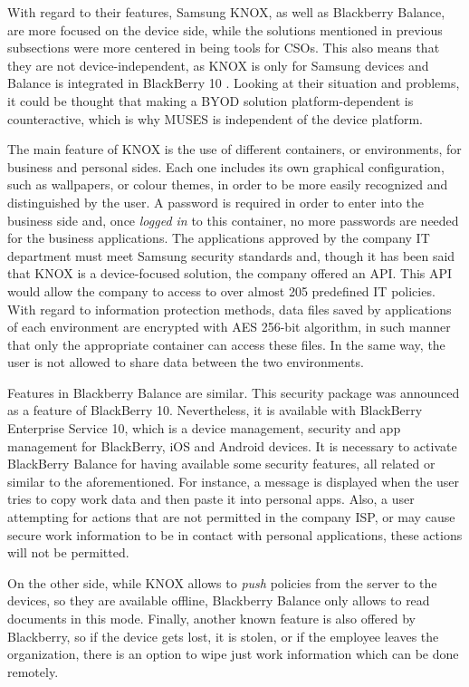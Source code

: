 With regard to their features, Samsung KNOX, as well as Blackberry Balance, are more focused on the device side, while the solutions mentioned in previous subsections were more centered in being tools for CSOs. This also means that they are not device-independent, as KNOX is only for Samsung devices and Balance is integrated in BlackBerry 10 \cite{Blackberry_tool}. Looking at their situation and problems, it could be thought that making a BYOD solution platform-dependent is counteractive, which is why MUSES is independent of the device platform.

The main feature of KNOX is the use of different containers, or environments, for business and personal sides. Each one includes its own graphical configuration, such as wallpapers, or colour themes, in order to be more easily recognized and distinguished by the user.
A password is required in order to enter into the business side and, once \textit{logged in} to this container, no more passwords are needed for the business applications. The applications approved by the company IT department must meet Samsung security standards and, though it has been said that KNOX is a device-focused solution, the company offered an API. This API would allow the company to access to over almost 205 predefined IT policies. With regard to information protection methods, data files saved by applications of each environment are encrypted with AES 256-bit algorithm, in such manner that only the appropriate container can access these files. In the same way, the user is not allowed to share data between the two environments. 

Features in Blackberry Balance are similar. This security package was announced as a feature of BlackBerry 10. Nevertheless, it is available with BlackBerry Enterprise Service 10, which is a device management, security and app management for BlackBerry, iOS and Android devices. It is necessary to activate BlackBerry Balance for having available some security features, all related or similar to the aforementioned. For instance, a message is displayed when the user tries to copy work data and then paste it into personal apps. Also, a user attempting for actions that are not permitted in the company ISP, or may cause secure work information to be in contact with personal applications, these actions will not be permitted. 

On the other side, while KNOX allows to \textit{push} policies from the server to the devices, so they are available offline, Blackberry Balance only allows to read documents in this mode. Finally, another known feature is also offered by Blackberry, so if the device gets lost, it is stolen, or if the employee leaves the organization, there is an option to wipe just work information which can be done remotely.

